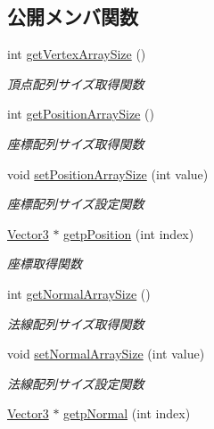 \subsection*{公開メンバ関数}
\begin{DoxyCompactItemize}
\item 
int \mbox{\hyperlink{class_md_bin_data_1_1_mesh_a9eb87c80b55731f3b7e9e75be3d57e66}{get\+Vertex\+Array\+Size}} ()
\begin{DoxyCompactList}\small\item\em 頂点配列サイズ取得関数 \end{DoxyCompactList}\item 
int \mbox{\hyperlink{class_md_bin_data_1_1_mesh_aa4f3f5971f94e1084b2b6f4777d48ad7}{get\+Position\+Array\+Size}} ()
\begin{DoxyCompactList}\small\item\em 座標配列サイズ取得関数 \end{DoxyCompactList}\item 
void \mbox{\hyperlink{class_md_bin_data_1_1_mesh_a684634dc8922d6286fc82ae12d41f3b4}{set\+Position\+Array\+Size}} (int value)
\begin{DoxyCompactList}\small\item\em 座標配列サイズ設定関数 \end{DoxyCompactList}\item 
\mbox{\hyperlink{class_md_bin_data_1_1_vector3}{Vector3}} $\ast$ \mbox{\hyperlink{class_md_bin_data_1_1_mesh_aeac6f04c4285834331a7fd93641dca8e}{getp\+Position}} (int index)
\begin{DoxyCompactList}\small\item\em 座標取得関数 \end{DoxyCompactList}\item 
int \mbox{\hyperlink{class_md_bin_data_1_1_mesh_a66050a951548d1da65e986bed4bb4a75}{get\+Normal\+Array\+Size}} ()
\begin{DoxyCompactList}\small\item\em 法線配列サイズ取得関数 \end{DoxyCompactList}\item 
void \mbox{\hyperlink{class_md_bin_data_1_1_mesh_a3fa1284fb7ee273be83925b118fbf918}{set\+Normal\+Array\+Size}} (int value)
\begin{DoxyCompactList}\small\item\em 法線配列サイズ設定関数 \end{DoxyCompactList}\item 
\mbox{\hyperlink{class_md_bin_data_1_1_vector3}{Vector3}} $\ast$ \mbox{\hyperlink{class_md_bin_data_1_1_mesh_ac6f223a7f0d6e0c9f1725ac2c00b1fac}{getp\+Normal}} (int index)

\end{DoxyCompactItemize}
